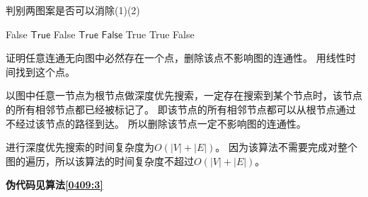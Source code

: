 \begin{questions}
    \begin{algorithm}
        \caption{判别两图案是否可以消除(1)(2)} \label{0409:2:12}
        \begin{algorithmic}[1]
             
            \State \Return \textsf{False}
            \EndIf
            \EndFor
            \State \Return $\mathsf{True}$
             
            \State \Return \textsf{False}
            \EndIf
            \EndFor
            \State \Return $\mathsf{True}$
            \Else {}
            \State \Return $\mathsf{False}$
            \EndIf
            \EndProcedure
            \Statex
            \State \Return \textsf{True}
            \State \Return \textsf{True}
            \EndIf
            \State \Return \textsf{False}
            \EndProcedure
        \end{algorithmic}
    \end{algorithm}

    \question 证明任意连通无向图中必然存在一个点，删除该点不影响图的连通性。
    用线性时间找到这个点。

    \begin{solution}
        以图中任意一节点为根节点做深度优先搜索，一定存在搜索到某个节点时，该节点的所有相邻节点都已经被标记了。
        即该节点的所有相邻节点都可以从根节点通过不经过该节点的路径到达。
        所以删除该节点一定不影响图的连通性。

        进行深度优先搜索的时间复杂度为$O(|V|+|E|)$。
        因为该算法不需要完成对整个图的遍历，所以该算法的时间复杂度不超过$O(|V|+|E|)$。

        \textbf{伪代码见算法\ref{0409:3}}
    \end{solution}


\end{questions}
